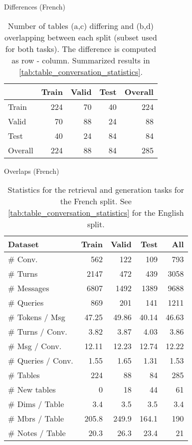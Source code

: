 \documentclass[11pt]{article}
\begin{document}
\begin{table}[t]
\begin{subtable}[]{\linewidth}
        \caption{Differences (French)}
    \end{subtable}
    \hfill
    \begin{subtable}[]{\linewidth}
        \centering
\begin{tabular}{lrrrr}
\toprule
{} &  Train &  Valid &  Test &  Overall \\
\midrule
Train   &    224 &     70 &    40 &      224 \\
Valid   &     70 &     88 &    24 &       88 \\
Test    &     40 &     24 &    84 &       84 \\
Overall &    224 &     88 &    84 &      285 \\
\bottomrule
\end{tabular}
        \caption{Overlaps (French)}
    \end{subtable}
    \caption{Number of tables (a,c) differing and (b,d) overlapping between each split (subset used for both tasks). The difference is computed as row - column. Summarized results in \autoref{tab:table_conversation_statistics}.}
    \label{tab:table_differences_and_overlaps}
\end{table}


\begin{table}[h]
    \small
    \centering
\begin{tabular}{lrrrr}
\toprule
          Dataset &  Train &  Valid &  Test &   All \\
\midrule
          \# Conv. &    562 &    122 &   109 &   793 \\
          \# Turns &   2147 &    472 &   439 &  3058 \\
       \# Messages &   6807 &   1492 &  1389 &  9688 \\
        \# Queries &    869 &    201 &    141 &   1211 \\
   \# Tokens / Msg &  47.25 &  49.86 & 40.14 & 46.63 \\
  \# Turns / Conv. &   3.82 &   3.87 &  4.03 &  3.86 \\
    \# Msg / Conv. &  12.11 &  12.23 & 12.74 & 12.22 \\
\# Queries / Conv. &   1.55 &   1.65 &   1.31 &   1.53 \\
     \midrule
         \# Tables &    224 &     88 &    84 &   285 \\
     \# New tables &      0 &     18 &    44 &    61 \\
   \# Dims / Table &    3.4 &    3.5 &   3.5 &   3.4 \\
   \# Mbrs / Table &  205.8 &  249.9 & 164.1 &   190 \\
  \# Notes / Table &   20.3 &   26.3 &  23.4 &    21 \\
\bottomrule
\end{tabular}
    \caption{Statistics for the retrieval and generation tasks for the French split. See \autoref{tab:table_conversation_statistics} for the English split.}
    \label{tab:table_conversation_statistics_fr}
\end{table}
\end{document}
